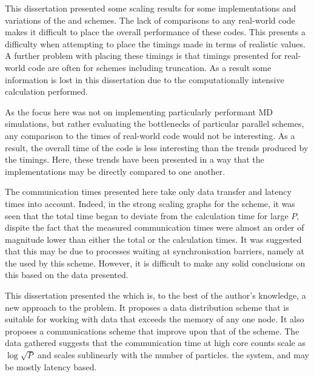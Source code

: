 This dissertation presented some scaling results for some implementations
and variations of the \replicateddata{} and \systolicloop{} schemes.
%
The lack of comparisons to any real-world code makes it difficult
to place the overall performance of these codes.
%
This presents a difficulty when attempting to place the timings
made in terms of realistic values.
%
A further problem with placing these timings is that timings presented
for real-world code are often for schemes including truncation.
%
As a result some information is lost in this dissertation due to
the computationally intensive calculation performed.

As the focus here was not on implementing particularly performant
MD simulations, but rather evaluating the bottlenecks of particular
parallel schemes, any comparison to the times of real-world code
would not be interesting.
%
As a result, the overall time of the code is less interesting than
the trends produced by the timings.
%
Here, these trends have been presented in a way that the
implementations may be directly compared to one another.

The communication times presented here take only data transfer and
latency times into account.
%
Indeed, in the strong scaling graphs for the \replicatedsystolicloop{}
scheme, it was seen that the total time began to deviate from the
calculation time for large $P$, dispite the fact that the measured
communication times were almost an order of magnitude lower than
either the total or the calculation times.
%
It was suggested that this may be due to processes waiting at
synchronisation barriers, namely at the \mpiallreduce{} used
by this scheme.
%
However, it is difficult to make any solid conclusions on this based
on the data presented.

This dissertation presented the \replicatedsystolicloop{} which is,
to the best of the author's knowledge, a new approach to the problem.
%
It proposes a data distribution scheme that is suitable for working
with data that exceeds the memory of any one node.
%
It also proposes a communications scheme that improve upon that
of the \replicateddata{} scheme.
%
The data gathered suggests that the communication time at high core
counts scale as $\log{\sqrt{P}}$ and scales sublinearly with the
number of particles.
the system, and may be mostly latency based.
